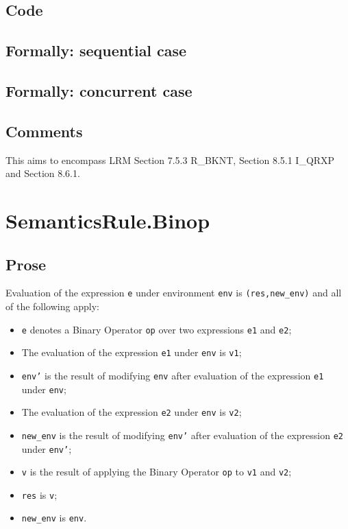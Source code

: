 \documentclass{book}
\begin{document}
  \subsection{Code}
\begin{emptyformal}
  \subsection{Formally: sequential case}

  \subsection{Formally: concurrent case}
\end{emptyformal}

\subsection{Comments}
  This aims to encompass LRM Section 7.5.3 R\_BKNT, Section 8.5.1 I\_QRXP and Section
  8.6.1.

\section{SemanticsRule.Binop \label{sec:SemanticsRule.Binop}}

  \subsection{Prose}
Evaluation of the expression \texttt{e} under environment \texttt{env} is \texttt{(res,new\_env)} and all of the following apply:
  \begin{itemize}
  \item \texttt{e} denotes a Binary Operator \texttt{op} over two expressions \texttt{e1} and \texttt{e2};
  \item The evaluation of the expression \texttt{e1} under \texttt{env} is \texttt{v1};
  \item \texttt{env'} is the result of modifying \texttt{env} after evaluation of the expression \texttt{e1} under \texttt{env};
  \item The evaluation of the expression \texttt{e2} under \texttt{env} is \texttt{v2};
  \item \texttt{new\_env} is the result of modifying \texttt{env'} after evaluation of the expression \texttt{e2} under \texttt{env'};
  \item \texttt{v} is the result of applying the Binary Operator \texttt{op} to \texttt{v1} and \texttt{v2};
  \item \texttt{res} is \texttt{v};
  \item \texttt{new\_env} is \texttt{env}.
  \end{itemize}
\end{document}

